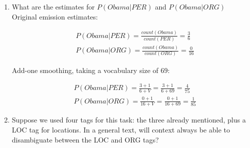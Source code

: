 \documentclass[12pt]{article}
\newcommand{\lp}{\left(}
\newcommand{\rp}{\right)}
\newenvironment{exercise}[2][Exercise]{\begin{trivlist}
\item[\hskip \labelsep {\bfseries #1}\hskip \labelsep {\bfseries #2.}]}{\end{trivlist}}
\begin{document}
\begin{exercise}{3. HMM Tagger}
\begin{enumerate}[label=(\alph*)]
\[
\mathbf{P} = 
        \begin{blockarray}{c@{\hspace{1pt}}rrrrr@{\hspace{3pt}}}
         & < s > & < PER > & < ORG > & < OTH > & < /s > \\
        \begin{block}{r@{\hspace{1pt}}|@{\hspace{1pt}}
    |@{\hspace{1pt}}rrrrr@{\hspace{1pt}}|@{\hspace{1pt}}|}
		< s >   & 0/8   & 3/8   & 1/8   & 4/8   & 0/8 \\
		< PER > & 0/10  & 4/10  & 1/10  & 4/10  & 1/10 \\
		< ORG > & 0/20  & 1/20  & 10/20 & 8/20  & 1/20\\
		< OTH > & 0/94  & 2/94  & 8/94  & 78/94 & 6/94 \\
		< /s >  & 5/5   & 0/5   & 0/5   & 0/5   & 0/5 \\
        \end{block}
    \end{blockarray}
\]

\item What are the estimates for $P \lp Obama|PER \rp$ and $P \lp Obama|ORG \rp$ \\

Original emission estimates:

\begin{align*}
	&P(Obama|PER) = \frac{\textit{count}(Obama)}{count(PER)} = \frac{3}{6}  \\
    &P(Obama|ORG) = \frac{\textit{count}(Obama)}{count(ORG)} = \frac{0}{16}
\end{align*}

Add-one smoothing, taking a vocabulary size of $69$:

\begin{align*}
	&P(Obama|PER) = \frac{3+1}{6+V} = \frac{3+1}{6+69} = \frac{4}{75} \\
    &P(Obama|ORG) = \frac{0+1}{16+V} = \frac{0+1}{16+69} = \frac{1}{85}
\end{align*}


\item Suppose we used four tags for this task: the three already mentioned, plus a LOC tag for locations. In a general text, will context always be able to disambiguate between the LOC and ORG tags? \\


\end{enumerate}
\end{exercise}
\end{document}
